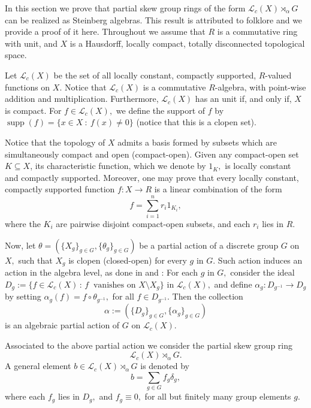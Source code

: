 \documentclass[11pt, a4paper]{amsart}
\newcommand{\Lc}{\ensuremath {\mathcal{L}_c(X)}}
\newcommand{\Lg}{\ensuremath {\mathcal{L}_c(X)\rtimes_{\alpha} G}}
\DeclareMathOperator{\supp}{supp}
\theoremstyle{plain}
\begin{document}
In this section we prove that partial skew group rings of the form $\Lg$ can be realized as Steinberg algebras. This result is attributed to folklore and we provide a proof of it here. Throughout we assume that $R$ is a commutative ring with unit, and $X$ is a Hausdorff, locally compact, totally disconnected topological space. 

Let $\Lc$ be the set of all locally constant, compactly supported, $R$-valued functions on $X$. Notice that $\Lc$ is a commutative $R$-algebra, with point-wise addition and multiplication. Furthermore, $\Lc$ has an unit if, and only if, $X$ is compact. For $f \in \Lc,$ we define the support of $f$ by $\supp(f)= \{x \in X \ :  \ f(x)\neq 0\}$ (notice that this is a clopen set).

Notice that the topology of $X$ admits a basis formed  by  subsets which are simultaneously compact and open (compact-open). Given any compact-open set $K \subseteq X$,  its characteristic function, which we denote by $1_K,$ is locally constant and compactly supported. Moreover, one may prove that every locally constant, compactly supported function $f : X \rightarrow R$ is a linear combination of the form 
$$f= \sum_{i=1}^n r_i1_{K_i},$$
where the $K_i$ are pairwise disjoint compact-open subsets, and each $r_i$ lies in $R.$

Now, let $\theta=(\{X_g\}_{g \in G}, \{\theta_g\}_{g \in G})$ be a partial action of a discrete group $G$ on $X,$ such that $X_g$ is clopen (closed-open) for every $g$ in $G.$ Such action induces an action in the algebra level, as done in \cite{Beuter} and \cite{Dokuchaev}: For each $g$ in $G,$ consider the ideal $D_g:= \{ f \in \Lc \, :  \, f \ \mbox{ vanishes on } X\setminus X_g \}$ in $\Lc,$ and define $\alpha_g: D_{g^{-1}} \rightarrow D_g$ by setting $\alpha_g(f)=f\circ \theta_{g^{-1}},$ for all $ f \in D_{g^{-1}}.$ Then the collection 
\begin{equation}
\alpha := ( \{D_g\}_{g \in G}, \{\alpha_g\}_{g \in G} )
\end{equation}
is an algebraic partial action of $G$ on $\Lc.$ 

Associated to the above partial action we consider the partial skew group ring 
\begin{equation}
\Lg.
\end{equation}
A general element $b \in \Lg$ is denoted by 
 $$b=\sum_{g \in G}f_g\delta_g,$$
where each $f_g$ lies in $D_g,$  and $f_g \equiv 0,$ for all but finitely many group elements $g.$ %
\end{document}
